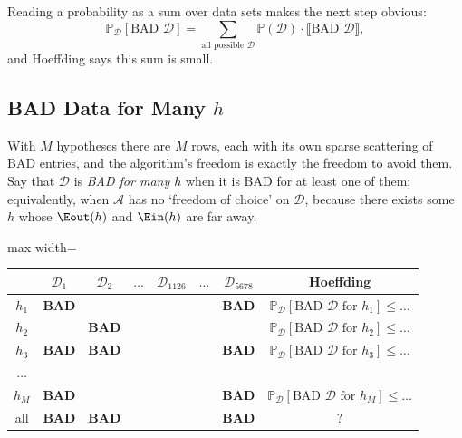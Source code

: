 Reading a probability as a sum over data sets makes the next step obvious:
\[
    \mathbb{P}_{\mathcal{D}}\left[ \text{BAD } \mathcal{D} \right]
    = \sum_{\text{all possible } \mathcal{D}} \mathbb{P}(\mathcal{D}) \cdot
    \llbracket \text{BAD } \mathcal{D} \rrbracket ,
\]
and Hoeffding says this sum is small.

\subsection{BAD Data for Many \texorpdfstring{\(h\)}{h}}

With \(M\) hypotheses there are \(M\) rows, each with its own sparse scattering
of BAD entries, and the algorithm's freedom is exactly the freedom to avoid
them. Say that \(\mathcal{D}\) is \emph{BAD for many \(h\)} when it is BAD for
at least one of them; equivalently, when \(\mathcal{A}\) has no `freedom of
choice' on \(\mathcal{D}\), because there exists some \(h\) whose \(\Eout(h)\)
and \(\Ein(h)\) are far away.

\begin{center}
    \begin{adjustbox}{max width=\textwidth}
        \solidrules
        \begin{tabular}{@{}c|cccccc|c@{}}
            \toprule
            & \(\mathcal{D}_1\) & \(\mathcal{D}_2\) & \(\dots\)
            & \(\mathcal{D}_{1126}\) & \(\dots\) & \(\mathcal{D}_{5678}\)
            & Hoeffding\\
            \midrule
            \(h_1\) & \textcolor{red!75!black}{\textbf{BAD}} & & & & &
            \textcolor{red!75!black}{\textbf{BAD}} &
            \(\mathbb{P}_{\mathcal{D}}\left[ \text{BAD } \mathcal{D}
            \text{ for } h_1 \right] \le \dots\)\\
            \(h_2\) & & \textcolor{red!75!black}{\textbf{BAD}} & & & & &
            \(\mathbb{P}_{\mathcal{D}}\left[ \text{BAD } \mathcal{D}
            \text{ for } h_2 \right] \le \dots\)\\
            \(h_3\) & \textcolor{red!75!black}{\textbf{BAD}}
            & \textcolor{red!75!black}{\textbf{BAD}} & & & &
            \textcolor{red!75!black}{\textbf{BAD}} &
            \(\mathbb{P}_{\mathcal{D}}\left[ \text{BAD } \mathcal{D}
            \text{ for } h_3 \right] \le \dots\)\\
            \(\dots\) & & & & & & &\\
            \(h_M\) & \textcolor{red!75!black}{\textbf{BAD}} & & & & &
            \textcolor{red!75!black}{\textbf{BAD}} &
            \(\mathbb{P}_{\mathcal{D}}\left[ \text{BAD } \mathcal{D}
            \text{ for } h_M \right] \le \dots\)\\
            \midrule
            all & \textcolor{orange!85!black}{\textbf{BAD}}
            & \textcolor{orange!85!black}{\textbf{BAD}} & & & &
            \textcolor{orange!85!black}{\textbf{BAD}} & \(?\)\\
            \bottomrule
        \end{tabular}
    \end{adjustbox}
\end{center}

